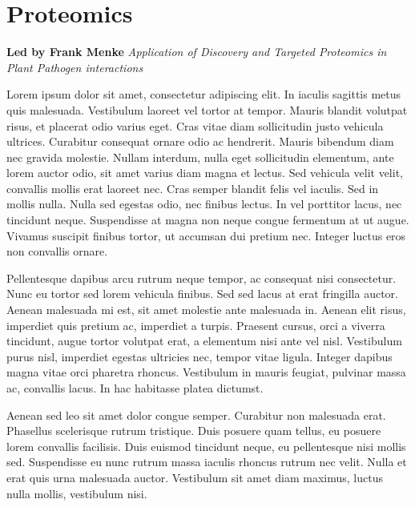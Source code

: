 \documentclass[12pt,]{book}
\begin{document}
\chapter*{Proteomics}\label{proteomics}

\textbf{Led by Frank Menke} \emph{Application of Discovery and Targeted
Proteomics in Plant Pathogen interactions}

Lorem ipsum dolor sit amet, consectetur adipiscing elit. In iaculis
sagittis metus quis malesuada. Vestibulum laoreet vel tortor at tempor.
Mauris blandit volutpat risus, et placerat odio varius eget. Cras vitae
diam sollicitudin justo vehicula ultrices. Curabitur consequat ornare
odio ac hendrerit. Mauris bibendum diam nec gravida molestie. Nullam
interdum, nulla eget sollicitudin elementum, ante lorem auctor odio, sit
amet varius diam magna et lectus. Sed vehicula velit velit, convallis
mollis erat laoreet nec. Cras semper blandit felis vel iaculis. Sed in
mollis nulla. Nulla sed egestas odio, nec finibus lectus. In vel
porttitor lacus, nec tincidunt neque. Suspendisse at magna non neque
congue fermentum at ut augue. Vivamus suscipit finibus tortor, ut
accumsan dui pretium nec. Integer luctus eros non convallis ornare.

Pellentesque dapibus arcu rutrum neque tempor, ac consequat nisi
consectetur. Nunc eu tortor sed lorem vehicula finibus. Sed sed lacus at
erat fringilla auctor. Aenean malesuada mi est, sit amet molestie ante
malesuada in. Aenean elit risus, imperdiet quis pretium ac, imperdiet a
turpis. Praesent cursus, orci a viverra tincidunt, augue tortor volutpat
erat, a elementum nisi ante vel nisl. Vestibulum purus nisl, imperdiet
egestas ultricies nec, tempor vitae ligula. Integer dapibus magna vitae
orci pharetra rhoncus. Vestibulum in mauris feugiat, pulvinar massa ac,
convallis lacus. In hac habitasse platea dictumst.

Aenean sed leo sit amet dolor congue semper. Curabitur non malesuada
erat. Phasellus scelerisque rutrum tristique. Duis posuere quam tellus,
eu posuere lorem convallis facilisis. Duis euismod tincidunt neque, eu
pellentesque nisi mollis sed. Suspendisse eu nunc rutrum massa iaculis
rhoncus rutrum nec velit. Nulla et erat quis urna malesuada auctor.
Vestibulum sit amet diam maximus, luctus nulla mollis, vestibulum nisi.
\end{document}

